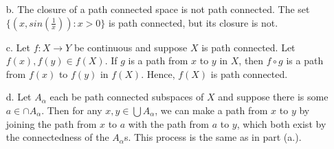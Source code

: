\documentclass[11pt, reqno]{article}
\theoremstyle{plain}
\theoremstyle{definition}
\theoremstyle{remark}
\begin{document}
\begin{enumerate}
\begin{enumerate}
        \item[b.] The closure of a path connected space is not path connected. The set $\{(x, sin(\frac{1}{x})): x > 0\}$
        is path connected, but its closure is not.

        \item[c.] Let $f: X \rightarrow Y$ be continuous and suppose $X$ is path connected. Let $f(x), f(y) \in f(X)$.
        If $g$ is a path from $x$ to $y$ in $X$, then $f\circ g$ is a path from $f(x)$ to $f(y)$ in $f(X)$. Hence,
        $f(X)$ is path connected.

        \item[d.] Let $A_\alpha$ each be path connected subspaces of $X$ and suppose there is some $a \in \cap A_\alpha$.
        Then for any $x, y \in \bigcup A_\alpha$, we can make a path from $x$ to $y$ by joining the path from $x$ to $a$
        with the path from $a$ to $y$, which both exist by the connectedness of the $A_\alpha$s. This process is the same
        as in part (a.).
    \end{enumerate}
\end{enumerate}
\end{document}
